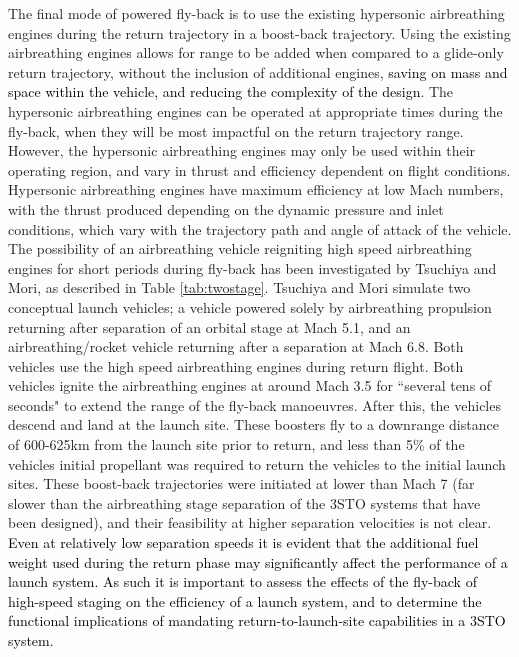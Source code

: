 The final mode of powered fly-back is to use the existing hypersonic airbreathing engines during the return trajectory in a boost-back trajectory. Using the existing airbreathing engines allows for range to be added when compared to a glide-only return trajectory, without the inclusion of additional engines, \textcolor{black}{saving on mass and space within the vehicle, and reducing the complexity of the design}. The hypersonic airbreathing engines can be operated at appropriate times during the fly-back, when they will be most impactful on the return trajectory range. However, the hypersonic airbreathing engines may only be used within their operating region, and vary in thrust and efficiency dependent on flight conditions. Hypersonic airbreathing engines have maximum efficiency at low Mach numbers\cite{Preller2017b}, with the thrust produced depending on the dynamic pressure and inlet conditions, which vary with the trajectory path and angle of attack of the vehicle. 
The possibility of an airbreathing vehicle reigniting high speed airbreathing engines for short periods during fly-back has been investigated by Tsuchiya and Mori\cite{Tsuchiya2005}, as described in Table \ref{tab:twostage}.  Tsuchiya and Mori simulate two conceptual launch vehicles; a vehicle powered solely by airbreathing propulsion returning after separation of an orbital stage at Mach 5.1, and an airbreathing/rocket vehicle returning after a separation at Mach 6.8\cite{Tsuchiya2005}.  Both vehicles use the high speed airbreathing engines during return flight. Both vehicles ignite the airbreathing engines at around Mach 3.5 for ``several tens of seconds" to extend the range of the fly-back manoeuvres. After this, the vehicles descend and land at the launch site. 
These boosters fly to a downrange distance of 600-625km from the launch site prior to return, and less than 5\% of the vehicles initial propellant was required to return the vehicles to the initial launch sites\cite{Tsuchiya2005}. These boost-back trajectories were initiated at lower than Mach 7 (far slower than the airbreathing stage separation of the 3STO systems that have been designed), and their feasibility at higher separation velocities is not clear.
\textcolor{black}{Even at relatively low separation speeds it is evident that the additional fuel weight used during the return phase may significantly affect the performance of a launch system. As such it is important to assess the effects of the fly-back of high-speed staging on the efficiency of a launch system, and to determine the functional implications of mandating return-to-launch-site capabilities in a 3STO system. }



